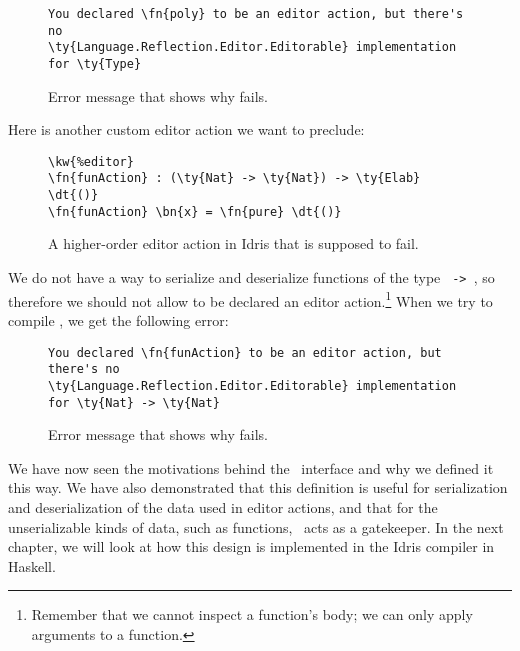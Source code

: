 
\begin{figure}[ht]
  \caption{Error message that shows why  fails.}
\begin{Verbatim}[framesep=2mm, label=\footnotesize{\normalfont{Idris error message}}, labelposition=topline]
You declared \fn{poly} to be an editor action, but there's no
\ty{Language.Reflection.Editor.Editorable} implementation for \ty{Type}
\end{Verbatim}
\end{figure}

Here is another custom editor action we want to preclude:

\begin{figure}[ht]
  \caption{A higher-order editor action  in Idris that is supposed to fail.}
\begin{Verbatim}[framesep=2mm, label=\footnotesize{\normalfont{Idris}}, labelposition=topline]
\kw{%editor}
\fn{funAction} : (\ty{Nat} -> \ty{Nat}) -> \ty{Elab} \dt{()}
\fn{funAction} \bn{x} = \fn{pure} \dt{()}
\end{Verbatim}
\end{figure}

We do not have a way to serialize and deserialize functions of the type
\texttt{ -> }, so therefore we should not allow 
to be declared an editor action.\footnote{Remember that we cannot inspect a
function's body; we can only apply arguments to a function.}
When we try to compile , we get the following error:

\begin{figure}[ht]
  \caption{Error message that shows why  fails.}
\begin{Verbatim}[framesep=2mm, label=\footnotesize{\normalfont{Idris error message}}, labelposition=topline]
You declared \fn{funAction} to be an editor action, but there's no
\ty{Language.Reflection.Editor.Editorable} implementation for \ty{Nat} -> \ty{Nat}
\end{Verbatim}
\end{figure}

We have now seen the motivations behind the \Editorable\ interface and
why we defined it this way. We have also demonstrated that this definition
is useful for serialization and deserialization of the data used in editor
actions, and that for the unserializable kinds of data, such as functions,
\Editorable\ acts as a gatekeeper. In the next chapter, we will look at how
this design is implemented in the Idris compiler in Haskell.


